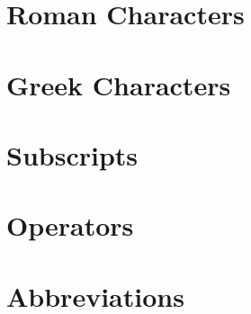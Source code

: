 \begin{nomenclature}

\section*{Roman Characters}

\section*{Greek Characters}

\section*{Subscripts}

\section*{Operators}

\section*{Abbreviations}

\end{nomenclature}